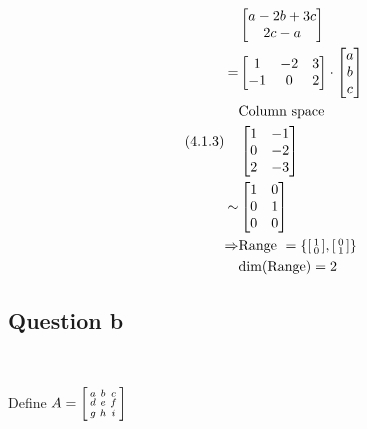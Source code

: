 \documentclass{article}
\begin{document}
\begin{equation}
\tag{4.1.3}
\begin{split}
&\begin{bmatrix}
a-2b+3c\\
2c-a\\
\end{bmatrix}\\
= &\begin{bmatrix}
1&-2&3\\
-1&0&2\\
\end{bmatrix}\cdot\begin{bmatrix}
a\\
b\\
c\\
\end{bmatrix}\\
&\text{Column space}\\
&\begin{bmatrix}
1&-1\\
0&-2\\
2&-3\\
\end{bmatrix}\\
\sim &\begin{bmatrix}
1&0\\
0&1\\
0&0\\
\end{bmatrix}\\
\Rightarrow &\text{Range }=\{\begin{bsmallmatrix}1\\0\end{bsmallmatrix},\begin{bsmallmatrix}0\\1\end{bsmallmatrix}\}\\
&\text{dim}(\text{Range})=2\\
\end{split}
\end{equation}

\subsection{Question b}

~

Define $A=\begin{bsmallmatrix}a&b&c\\d&e&f\\g&h&i\end{bsmallmatrix}$
\end{document}
